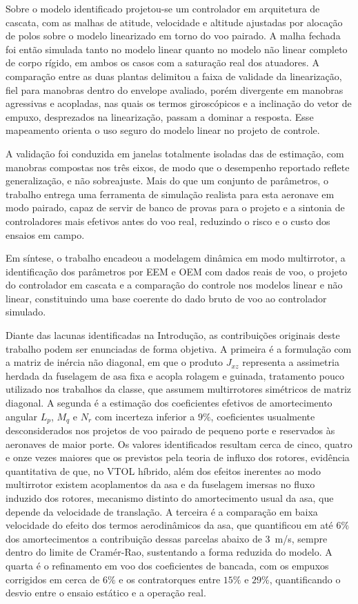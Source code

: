 Sobre o modelo identificado projetou-se um controlador em arquitetura de cascata, com as malhas de atitude, velocidade e altitude ajustadas por alocação de polos sobre o modelo linearizado em torno do voo pairado. A malha fechada foi então simulada tanto no modelo linear quanto no modelo não linear completo de corpo rígido, em ambos os casos com a saturação real dos atuadores. A comparação entre as duas plantas delimitou a faixa de validade da linearização, {\color{blue}fiel para manobras dentro do envelope avaliado}, porém divergente em manobras agressivas e acopladas, nas quais os termos giroscópicos e a inclinação do vetor de empuxo, desprezados na linearização, passam a dominar a resposta. Esse mapeamento orienta o uso seguro do modelo linear no projeto de controle.

{\color{blue}A validação foi conduzida em janelas totalmente isoladas das de estimação, com manobras compostas nos três eixos, de modo que o desempenho reportado reflete generalização, e não sobreajuste.} Mais do que um conjunto de parâmetros, o trabalho entrega uma ferramenta de simulação realista para esta aeronave {\color{blue}em modo pairado}, capaz de servir de banco de provas para o projeto e a sintonia de controladores mais efetivos antes do voo real, reduzindo o risco e o custo dos ensaios em campo.

{\color{blue}Em síntese, o trabalho encadeou a modelagem dinâmica em modo multirrotor, a identificação dos parâmetros por EEM e OEM com dados reais de voo, o projeto do controlador em cascata e a comparação do controle nos modelos linear e não linear, constituindo uma base coerente do dado bruto de voo ao controlador simulado.}

{\color{blue}Diante das lacunas identificadas na Introdução, as contribuições originais deste trabalho podem ser enunciadas de forma objetiva. A primeira é a formulação com a matriz de inércia não diagonal, em que o produto $J_{xz}$ representa a assimetria herdada da fuselagem de asa fixa e acopla rolagem e guinada, tratamento pouco utilizado nos trabalhos da classe, que assumem multirrotores simétricos de matriz diagonal. A segunda é a estimação dos coeficientes efetivos de amortecimento angular $L_p$, $M_q$ e $N_r$ com incerteza inferior a $9\%$, coeficientes usualmente desconsiderados nos projetos de voo pairado de pequeno porte e reservados às aeronaves de maior porte. Os valores identificados resultam cerca de cinco, quatro e onze vezes maiores que os previstos pela teoria de influxo dos rotores, evidência quantitativa de que, no VTOL híbrido, além dos efeitos inerentes ao modo multirrotor existem acoplamentos da asa e da fuselagem imersas no fluxo induzido dos rotores, mecanismo distinto do amortecimento usual da asa, que depende da velocidade de translação. A terceira é a comparação em baixa velocidade do efeito dos termos aerodinâmicos da asa, que quantificou em até $6\%$ dos amortecimentos a contribuição dessas parcelas abaixo de $3$~m/s, sempre dentro do limite de Cramér-Rao, sustentando a forma reduzida do modelo. A quarta é o refinamento em voo dos coeficientes de bancada, com os empuxos corrigidos em cerca de $6\%$ e os contratorques entre $15\%$ e $29\%$, quantificando o desvio entre o ensaio estático e a operação real.}

